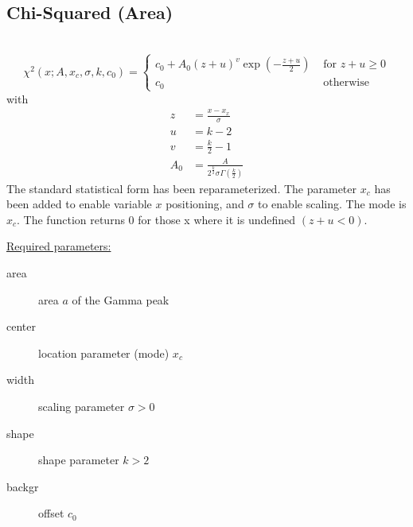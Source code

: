\subsection{Chi-Squared (Area)} ~\\
\label{sec:ChiSquaredArea}
\begin{equation}
\chi^2(x;A,x_c,\sigma,k,c_0) =
\begin{cases}
c_0+A_0 \left(z+u\right)^{v} \exp\left(-\frac{z+u}{2}\right) & \mbox{ for } z+u \geq 0 \\
c_0 & \mbox{ otherwise}
\end{cases}
\end{equation}
with
\begin{align}
z &= \frac{x-x_x}{\sigma} \\
u &= k-2 \\
v &= \frac{k}{2}-1 \\
A_0 &= \frac{A}{ 2^{\frac{k}{2}} \sigma\Gamma\left(\frac{k}{2}\right)}
\end{align}
The standard statistical form has been reparameterized. The parameter $x_c$ has been added
to enable variable $x$ positioning, and $\sigma$ to enable scaling. The mode is $x_c$.
The function returns 0 for those x where it is undefined $(z+u<0)$.

\vspace{5mm}

\uline{Required parameters:}
\begin{description}
    \item[area] area $a$ of the Gamma peak
    \item[center] location parameter (mode) $x_c$
    \item[width] scaling parameter $\sigma>0$
    \item[shape] shape parameter $k>2$
    \item[backgr] offset $c_0$
\end{description}

